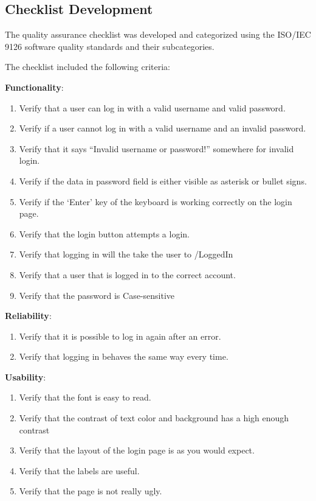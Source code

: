 \documentclass[journal,twocolumn]{IEEEtran}
\begin{document}
\subsection{Checklist Development}
The quality assurance checklist was developed and categorized using the ISO/IEC 9126 software quality standards and their subcategories.

The checklist included the following criteria:

\textbf{Functionality}:
\begin{enumerate}[label=1.\arabic*]
    \item Verify that a user can log in with a valid username and valid password.
    \item Verify if a user cannot log in with a valid username and an invalid password.
    \item Verify that it says “Invalid username or password!” somewhere for invalid login.
    \item Verify if the data in password field is either visible as asterisk or bullet signs.
    \item Verify if the ‘Enter’ key of the keyboard is working correctly on the login page.
    \item Verify that the login button attempts a login.
    \item Verify that logging in will the take the user to /LoggedIn
    \item Verify that a user that is logged in to the correct account.
    \item Verify that the password is Case-sensitive
\end{enumerate}

\textbf{Reliability}:

\begin{enumerate}[label=2.\arabic*]
    \item Verify that it is possible to log in again after an error.
    \item Verify that logging in behaves the same way every time.
\end{enumerate}

\textbf{Usability}:

\begin{enumerate}[label=3.\arabic*]
    \item Verify that the font is easy to read.
    \item Verify that the contrast of text color and background has a high enough contrast
    \item Verify that the layout of the login page is as you would expect.
    \item Verify that the labels are useful.
    \item Verify that the page is not really ugly.
\end{enumerate}
\end{document}
